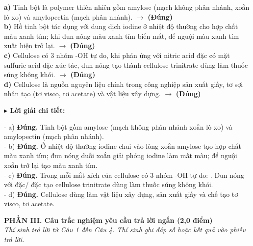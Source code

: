 \documentclass[11pt,a4paper]{article}
\newcommand{\loigiai}[1]{
    \par\vspace{2pt}
    \begingroup\leftskip=12pt
    \textcolor{solBlue}{\textbf{$\blacktriangleright$ Lời giải chi tiết:}}\par
    \small #1
    \par\endgroup\vspace{3pt}
}
\begin{document}
\quad \textbf{a)} Tinh bột là polymer thiên nhiên gồm amylose (mạch không phân nhánh, xoắn lò xo) và amylopectin (mạch phân nhánh). \quad $\to$ \textbf{\color{ansRed}(Đúng)}\\[2pt]
\quad \textbf{b)} Hồ tinh bột tác dụng với dung dịch iodine ở nhiệt độ thường cho hợp chất màu xanh tím; khi đun nóng màu xanh tím biến mất, để nguội màu xanh tím xuất hiện trở lại. \quad $\to$ \textbf{\color{ansRed}(Đúng)}\\[2pt]
\quad \textbf{c)} Cellulose có 3 nhóm -OH tự do, khi phản ứng với nitric acid đặc có mặt sulfuric acid đặc xúc tác, đun nóng tạo thành cellulose trinitrate dùng làm thuốc súng không khói. \quad $\to$ \textbf{\color{ansRed}(Đúng)}\\[2pt]
\quad \textbf{d)} Cellulose là nguồn nguyên liệu chính trong công nghiệp sản xuất giấy, tơ sợi nhân tạo (tơ visco, tơ acetate) và vật liệu xây dựng. \quad $\to$ \textbf{\color{ansRed}(Đúng)}\\[2pt]
\loigiai{- a) \textbf{Đúng.} Tinh bột gồm amylose (mạch không phân nhánh xoắn lò xo) và amylopectin (mạch phân nhánh).\\
- b) \textbf{Đúng.} Ở nhiệt độ thường iodine chui vào lòng xoắn amylose tạo hợp chất màu xanh tím; đun nóng duỗi xoắn giải phóng iodine làm mất màu; để nguội xoắn trở lại tạo màu xanh tím.\\
- c) \textbf{Đúng.} Trong mỗi mắt xích \ce{C6H10O5} của cellulose có 3 nhóm -OH tự do: \ce{[C6H7O2(OH)3]_n}. Đun nóng với \ce{HNO3} đặc/\ce{H2SO4} đặc tạo cellulose trinitrate dùng làm thuốc súng không khói.\\
- d) \textbf{Đúng.} Cellulose dùng làm vật liệu xây dựng, sản xuất giấy và chế tạo tơ visco, tơ acetate.}

\vspace{4pt}
\noindent\textbf{\large\color{mainGreen}PHẦN III. Câu trắc nghiệm yêu cầu trả lời ngắn (2,0 điểm)}\\
\textit{Thí sinh trả lời từ Câu 1 đến Câu 4. Thí sinh ghi đáp số hoặc kết quả vào phiếu trả lời.}
\vspace{4pt}
\end{document}
